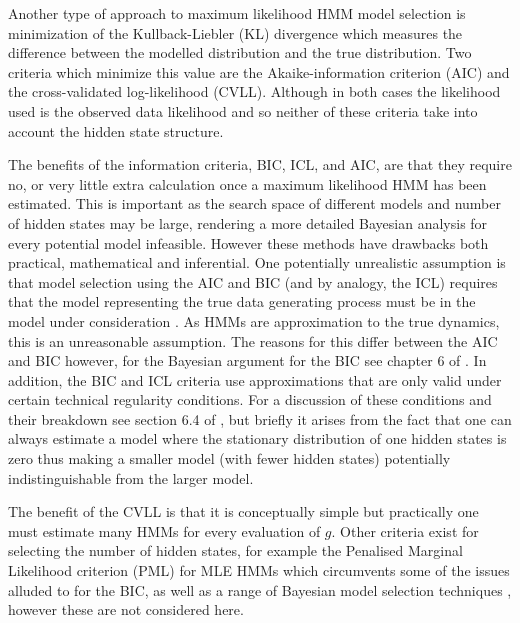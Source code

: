 Another type of approach to maximum likelihood HMM model selection is minimization of the Kullback-Liebler (KL) divergence \cite{kullbackInformationSufficiency1951} which  measures the difference between the modelled distribution and the true distribution. Two criteria which minimize this value are the Akaike-information criterion (AIC) \cite{akaikeInformationTheoryExtension1998} and the cross-validated log-likelihood \cite{celeuxSelectingHiddenMarkov2008} (CVLL). Although in both cases the likelihood used is the observed data likelihood and so neither of these criteria take into account the hidden state structure.  

The benefits of the information criteria, BIC, ICL, and AIC, are that they require no, or very little extra calculation once a maximum likelihood HMM has been estimated. This is important as the search space of different models and number of hidden states may be large, rendering a more detailed Bayesian analysis for every potential model infeasible. However these methods have drawbacks both practical, mathematical and inferential. One potentially unrealistic assumption is that model selection using the AIC and BIC (and by analogy, the ICL) requires that the model representing the true data generating process must be in the model under consideration \cite{ripley_1996}. As HMMs are approximation to the true dynamics, this is an unreasonable assumption. The reasons for this differ between the AIC and BIC however, for the Bayesian argument for the BIC see chapter 6 of \cite{bernardo2007bayesian}. In addition, the BIC and ICL criteria use approximations that are only valid under certain technical regularity conditions. For a discussion of these conditions and their breakdown see section 6.4 of \cite{mclachlanFiniteMixtureModels2000}, but briefly it arises from the fact that one can always estimate a model where the stationary distribution of one hidden states is zero thus making a smaller model (with fewer hidden states) potentially indistinguishable from the larger model. 

The benefit of the CVLL  is that it is conceptually simple but practically  one must estimate many HMMs for every evaluation of $g$. Other criteria exist for selecting the number of hidden states, for example the Penalised Marginal Likelihood criterion (PML) \cite{gassiatLikelihoodRatioInequalities2002} for MLE HMMs which circumvents some of the issues alluded to for the BIC, as well as a range of Bayesian model selection techniques \cite{gelmanBayesianDataAnalysis2014}\cite{bernardo2007bayesian}, however these are not considered here. 

